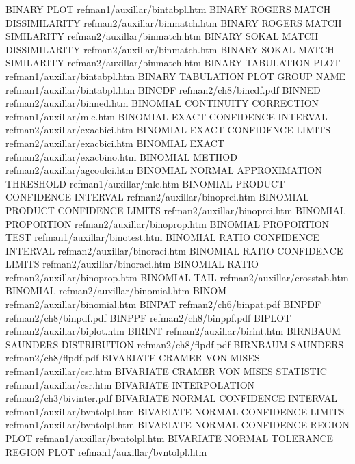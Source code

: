 BINARY PLOT                             refman1/auxillar/bintabpl.htm
BINARY ROGERS MATCH DISSIMILARITY       refman2/auxillar/binmatch.htm
BINARY ROGERS MATCH SIMILARITY          refman2/auxillar/binmatch.htm
BINARY SOKAL MATCH DISSIMILARITY        refman2/auxillar/binmatch.htm
BINARY SOKAL MATCH SIMILARITY           refman2/auxillar/binmatch.htm
BINARY TABULATION PLOT                  refman1/auxillar/bintabpl.htm
BINARY TABULATION PLOT GROUP NAME       refman1/auxillar/bintabpl.htm
BINCDF                                  refman2/ch8/bincdf.pdf
BINNED                                  refman2/auxillar/binned.htm
BINOMIAL CONTINUITY CORRECTION          refman1/auxillar/mle.htm
BINOMIAL EXACT CONFIDENCE INTERVAL      refman2/auxillar/exacbici.htm
BINOMIAL EXACT CONFIDENCE LIMITS        refman2/auxillar/exacbici.htm
BINOMIAL EXACT                          refman2/auxillar/exacbino.htm
BINOMIAL METHOD                         refman2/auxillar/agcoulci.htm
BINOMIAL NORMAL APPROXIMATION THRESHOLD refman1/auxillar/mle.htm
BINOMIAL PRODUCT CONFIDENCE INTERVAL    refman2/auxillar/binoprci.htm
BINOMIAL PRODUCT CONFIDENCE LIMITS      refman2/auxillar/binoprci.htm
BINOMIAL PROPORTION                     refman2/auxillar/binoprop.htm
BINOMIAL PROPORTION TEST                refman1/auxillar/binotest.htm
BINOMIAL RATIO CONFIDENCE INTERVAL      refman2/auxillar/binoraci.htm
BINOMIAL RATIO CONFIDENCE LIMITS        refman2/auxillar/binoraci.htm
BINOMIAL RATIO                          refman2/auxillar/binoprop.htm
BINOMIAL TAIL                           refman2/auxillar/crosstab.htm
BINOMIAL                                refman2/auxillar/binomial.htm
BINOM                                   refman2/auxillar/binomial.htm
BINPAT                                  refman2/ch6/binpat.pdf
BINPDF                                  refman2/ch8/binpdf.pdf
BINPPF                                  refman2/ch8/binppf.pdf
BIPLOT                                  refman2/auxillar/biplot.htm
BIRINT                                  refman2/auxillar/birint.htm
BIRNBAUM SAUNDERS DISTRIBUTION          refman2/ch8/flpdf.pdf
BIRNBAUM SAUNDERS                       refman2/ch8/flpdf.pdf
BIVARIATE CRAMER VON MISES              refman1/auxillar/csr.htm
BIVARIATE CRAMER VON MISES STATISTIC    refman1/auxillar/csr.htm
BIVARIATE INTERPOLATION                 refman2/ch3/bivinter.pdf
BIVARIATE NORMAL CONFIDENCE INTERVAL    refman1/auxillar/bvntolpl.htm
BIVARIATE NORMAL CONFIDENCE LIMITS      refman1/auxillar/bvntolpl.htm
BIVARIATE NORMAL CONFIDENCE REGION PLOT refman1/auxillar/bvntolpl.htm
BIVARIATE NORMAL TOLERANCE REGION PLOT  refman1/auxillar/bvntolpl.htm
